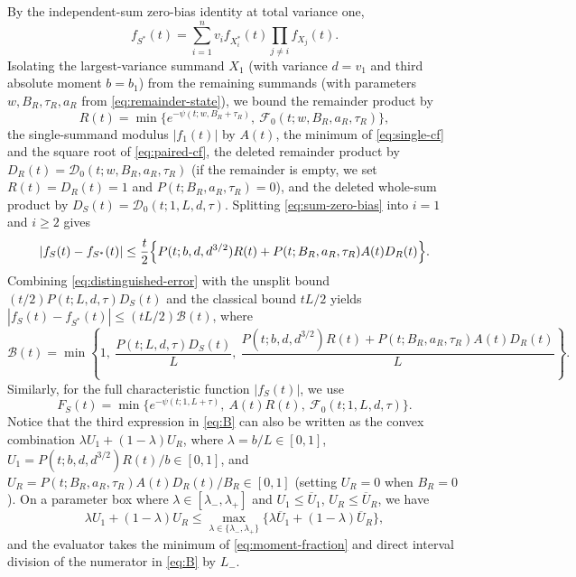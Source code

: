 \documentclass[11pt]{article}
\numberwithin{equation}{section}
\theoremstyle{remark}
\begin{document}
By the independent-sum zero-bias identity \citep[Lemma~2.1(5)]{GoldsteinReinert1997}
at total variance one,
\begin{equation}\label{eq:sum-zero-bias}
 f_{S^*}(t)=\sum_{i=1}^n v_i f_{X_i^*}(t)\prod_{j\ne i}f_{X_j}(t).
\end{equation}
Isolating the largest-variance summand $X_1$ (with variance $d=v_1$ and
third absolute moment $b=b_1$) from the remaining summands (with parameters
$w,B_R,\tau_R,a_R$ from \eqref{eq:remainder-state}), we bound the remainder
product by
\[
 R(t)=\min\bigl\{e^{-\psi(t;w,B_R+\tau_R)},\
                  \mathcal F_0(t;w,B_R,a_R,\tau_R)\bigr\},
\]
the single-summand modulus $|f_1(t)|$ by $A(t)$, the minimum of
\eqref{eq:single-cf} and the square root of \eqref{eq:paired-cf}, the
deleted remainder product by $D_R(t)=\mathcal D_0(t;w,B_R,a_R,\tau_R)$ (if the
remainder is empty, we set $R(t)=D_R(t)=1$ and $P(t;B_R,a_R,\tau_R)=0$), and
the deleted whole-sum product by $D_S(t)=\mathcal D_0(t;1,L,d,\tau)$.
Splitting \eqref{eq:sum-zero-bias} into $i=1$ and $i\ge2$ gives
\begin{equation}\label{eq:distinguished-error}
 |f_S(t)-f_{S^*}(t)|\le\frac t2\Bigl\{
 P(t;b,d,d^{3/2})R(t)+P(t;B_R,a_R,\tau_R)A(t)D_R(t)\Bigr\}.
\end{equation}
Combining \eqref{eq:distinguished-error} with the unsplit bound
$(t/2)P(t;L,d,\tau)D_S(t)$ and the classical bound $tL/2$ yields
$|f_S(t)-f_{S^*}(t)|\le(tL/2)\mathcal B(t)$, where
\begin{equation}\label{eq:B}
 \mathcal B(t)=\min\left\{1,\ \frac{P(t;L,d,\tau)D_S(t)}L,\
 \frac{P(t;b,d,d^{3/2})R(t)+P(t;B_R,a_R,\tau_R)A(t)D_R(t)}L
 \right\}.
\end{equation}
Similarly, for the full characteristic function $|f_S(t)|$, we use
\begin{equation}\label{eq:whole-cf}
 F_S(t)=\min\bigl\{e^{-\psi(t;1,L+\tau)},\ A(t)R(t),\
                    \mathcal F_0(t;1,L,d,\tau)\bigr\}.
\end{equation}
Notice that the third expression in \eqref{eq:B} can also be written as the
convex combination $\lambda U_1+(1-\lambda)U_R$, where $\lambda=b/L\in[0,1]$,
$U_1=P(t;b,d,d^{3/2})R(t)/b\in[0,1]$, and
$U_R=P(t;B_R,a_R,\tau_R)A(t)D_R(t)/B_R\in[0,1]$ (setting $U_R=0$ when
$B_R=0$). On a parameter box where
$\lambda\in[\lambda_-,\lambda_+]$ and $U_1\le\overline U_1$,
$U_R\le\overline U_R$, we have
\begin{equation}\label{eq:moment-fraction}
 \lambda U_1+(1-\lambda)U_R\le
 \max_{\lambda\in\{\lambda_-,\lambda_+\}}
       \{\lambda\overline U_1+(1-\lambda)\overline U_R\},
\end{equation}
and the evaluator takes the minimum of \eqref{eq:moment-fraction} and direct
interval division of the numerator in \eqref{eq:B} by $L_-$.
\end{document}
